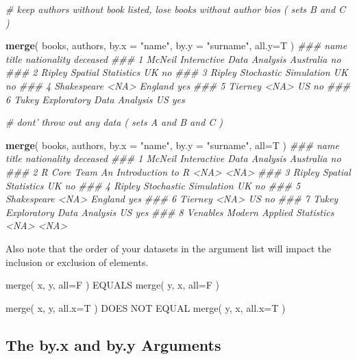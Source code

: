 \documentclass[]{book}
\newenvironment{Shaded}{\begin{snugshade}}{\end{snugshade}}
\newcommand{\CommentTok}[1]{\textcolor[rgb]{0.56,0.35,0.01}{\textit{#1}}}
\newcommand{\DataTypeTok}[1]{\textcolor[rgb]{0.13,0.29,0.53}{#1}}
\newcommand{\KeywordTok}[1]{\textcolor[rgb]{0.13,0.29,0.53}{\textbf{#1}}}
\newcommand{\NormalTok}[1]{#1}
\newcommand{\StringTok}[1]{\textcolor[rgb]{0.31,0.60,0.02}{#1}}
\theoremstyle{definition}
\theoremstyle{definition}
\theoremstyle{definition}
\theoremstyle{remark}
\begin{document}
\begin{Shaded}
\begin{Highlighting}[]
\CommentTok{# keep authors without book listed, lose books without author bios   ( sets B and C )}

\KeywordTok{merge}\NormalTok{( books, authors, }\DataTypeTok{by.x =} \StringTok{"name"}\NormalTok{, }\DataTypeTok{by.y =} \StringTok{"surname"}\NormalTok{, }\DataTypeTok{all.y=}\NormalTok{T )    }
\CommentTok{###          name                     title nationality deceased}
\CommentTok{### 1      McNeil Interactive Data Analysis   Australia       no}
\CommentTok{### 2      Ripley        Spatial Statistics          UK       no}
\CommentTok{### 3      Ripley     Stochastic Simulation          UK       no}
\CommentTok{### 4 Shakespeare                      <NA>     England      yes}
\CommentTok{### 5     Tierney                      <NA>          US       no}
\CommentTok{### 6       Tukey Exploratory Data Analysis          US      yes}



\CommentTok{# dont' throw out any data   ( sets A and B and C )}

\KeywordTok{merge}\NormalTok{( books, authors, }\DataTypeTok{by.x =} \StringTok{"name"}\NormalTok{, }\DataTypeTok{by.y =} \StringTok{"surname"}\NormalTok{, }\DataTypeTok{all=}\NormalTok{T )   }
\CommentTok{###          name                     title nationality deceased}
\CommentTok{### 1      McNeil Interactive Data Analysis   Australia       no}
\CommentTok{### 2 R Core Team      An Introduction to R        <NA>     <NA>}
\CommentTok{### 3      Ripley        Spatial Statistics          UK       no}
\CommentTok{### 4      Ripley     Stochastic Simulation          UK       no}
\CommentTok{### 5 Shakespeare                      <NA>     England      yes}
\CommentTok{### 6     Tierney                      <NA>          US       no}
\CommentTok{### 7       Tukey Exploratory Data Analysis          US      yes}
\CommentTok{### 8    Venables Modern Applied Statistics        <NA>     <NA>}
\end{Highlighting}
\end{Shaded}

Also note that the order of your datasets in the argument list will
impact the inclusion or exclusion of elements.

merge( x, y, all=F ) EQUALS merge( y, x, all=F )

merge( x, y, all.x=T ) DOES NOT EQUAL merge( y, x, all.x=T )

\hypertarget{the-by.x-and-by.y-arguments}{%
\subsection{The by.x and by.y
Arguments}\label{the-by.x-and-by.y-arguments}}
\end{document}
